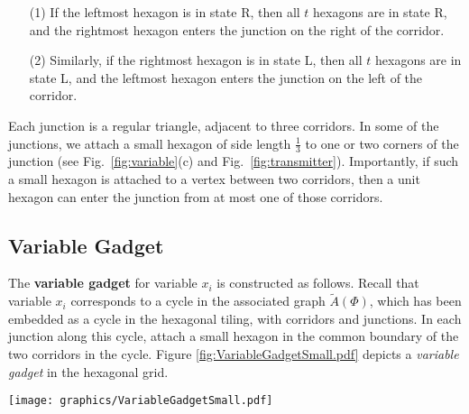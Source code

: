 \begin{observation}\label{obs:corridor}
\begin{itemize}
\item[(1)] If the leftmost hexagon is in state R, then all $t$ hexagons are in state R, and the rightmost hexagon enters the junction on the right of the corridor.
\item[(2)] Similarly, if the rightmost hexagon is in state L, then all $t$ hexagons are in state L, and the leftmost hexagon enters the junction on the left of the corridor.
\end{itemize}
\end{observation}
Each junction is a regular triangle, adjacent to three corridors. 
In some of the junctions, we attach a small hexagon of side length $\frac{1}{3}$ to one or two corners of the junction (see Fig.~\ref{fig:variable}(c) and Fig.~\ref{fig:transmitter}). 
Importantly, if such a small hexagon is attached to a vertex between two corridors, then a unit hexagon can enter the junction from at most one of those corridors.
\subsection{Variable Gadget}
The {\bf variable gadget} for variable $x_i$ is constructed as follows. 
Recall that variable $x_i$ corresponds to a cycle in the associated graph $\tilde{A}(\Phi)$, which has been embedded as a cycle in the hexagonal tiling, with corridors and junctions. 
In each junction along this cycle, attach a small hexagon in the common boundary of the two corridors in the cycle. 
Figure \ref{fig:VariableGadgetSmall.pdf} depicts a \textit{variable gadget} in the hexagonal grid.

\begin{minipage}{\linewidth}
\begin{center}
\texttt{[image: graphics/VariableGadgetSmall.pdf]}
\label{fig:VariableGadgetSmall.pdf}
\end{center}
\end{minipage}

